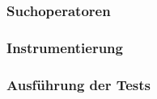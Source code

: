 \documentclass{article}
\begin{document}
\subsubsection{Suchoperatoren}


\subsubsection{Instrumentierung}

\subsubsection{Ausführung der Tests}

\end{document}
